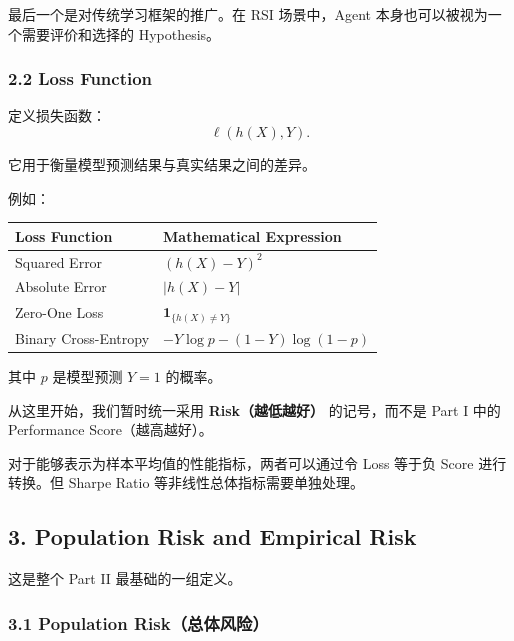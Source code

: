 最后一个是对传统学习框架的推广。在 RSI 场景中，Agent 本身也可以被视为一个需要评价和选择的 Hypothesis。

\hypertarget{part-2-12-0001-loss-function}{%
\subsubsection{2.2 Loss Function}\label{part-2-12-0001-loss-function}}

定义损失函数：
\[\ell(h(X),Y).\]

它用于衡量模型预测结果与真实结果之间的差异。

例如：

\begin{readertable}
\begin{longtable}[]{@{}
  >{\raggedright\arraybackslash}p{}
  >{\raggedright\arraybackslash}p{}@{}}
\toprule
Loss Function & Mathematical Expression \\
\midrule
\endhead
Squared Error & \((h(X)-Y)^2\) \\
Absolute Error & \(\lvert h(X)-Y\rvert\) \\
Zero-One Loss & \(\mathbf 1_{\{h(X)\neq Y\}}\) \\
Binary Cross-Entropy & \(-Y\log p-(1-Y)\log(1-p)\) \\
\bottomrule
\end{longtable}
\end{readertable}

其中 \(p\) 是模型预测 \(Y=1\) 的概率。

从这里开始，我们暂时统一采用 \textbf{Risk（越低越好）} 的记号，而不是 Part I 中的 Performance Score（越高越好）。

对于能够表示为样本平均值的性能指标，两者可以通过令 Loss 等于负 Score 进行转换。但 Sharpe Ratio 等非线性总体指标需要单独处理。

\hypertarget{part-2-12-0001-population-risk-and-empirical-risk}{%
\subsection{3. Population Risk and Empirical Risk}\label{part-2-12-0001-population-risk-and-empirical-risk}}

这是整个 Part II 最基础的一组定义。

\hypertarget{part-2-12-0001-population-riskux603bux4f53ux98ceux9669}{%
\subsubsection{3.1 Population Risk（总体风险）}\label{part-2-12-0001-population-riskux603bux4f53ux98ceux9669}}

